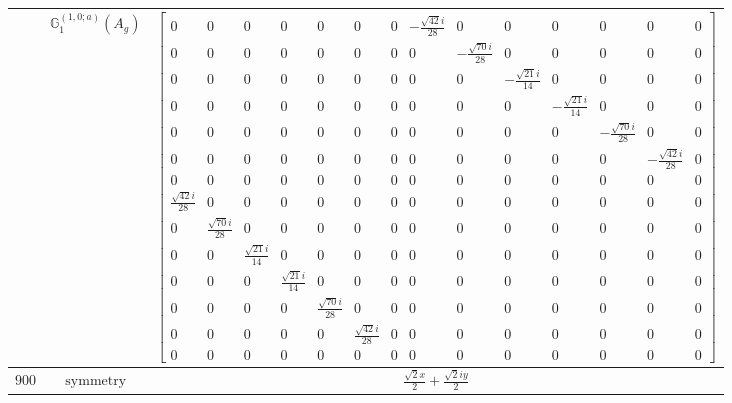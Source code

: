 \documentclass[fleqn,8pt,landscape]{jsarticle}
\begin{document}
\begin{longtable}{ccc}
$  $ & $ \mathbb{G}_{1}^{(1,0;a)}(A_{g}) $ & $ \begin{bmatrix} 0 & 0 & 0 & 0 & 0 & 0 & 0 & - \frac{\sqrt{42} i}{28} & 0 & 0 & 0 & 0 & 0 & 0 \\ 0 & 0 & 0 & 0 & 0 & 0 & 0 & 0 & - \frac{\sqrt{70} i}{28} & 0 & 0 & 0 & 0 & 0 \\ 0 & 0 & 0 & 0 & 0 & 0 & 0 & 0 & 0 & - \frac{\sqrt{21} i}{14} & 0 & 0 & 0 & 0 \\ 0 & 0 & 0 & 0 & 0 & 0 & 0 & 0 & 0 & 0 & - \frac{\sqrt{21} i}{14} & 0 & 0 & 0 \\ 0 & 0 & 0 & 0 & 0 & 0 & 0 & 0 & 0 & 0 & 0 & - \frac{\sqrt{70} i}{28} & 0 & 0 \\ 0 & 0 & 0 & 0 & 0 & 0 & 0 & 0 & 0 & 0 & 0 & 0 & - \frac{\sqrt{42} i}{28} & 0 \\ 0 & 0 & 0 & 0 & 0 & 0 & 0 & 0 & 0 & 0 & 0 & 0 & 0 & 0 \\ \frac{\sqrt{42} i}{28} & 0 & 0 & 0 & 0 & 0 & 0 & 0 & 0 & 0 & 0 & 0 & 0 & 0 \\ 0 & \frac{\sqrt{70} i}{28} & 0 & 0 & 0 & 0 & 0 & 0 & 0 & 0 & 0 & 0 & 0 & 0 \\ 0 & 0 & \frac{\sqrt{21} i}{14} & 0 & 0 & 0 & 0 & 0 & 0 & 0 & 0 & 0 & 0 & 0 \\ 0 & 0 & 0 & \frac{\sqrt{21} i}{14} & 0 & 0 & 0 & 0 & 0 & 0 & 0 & 0 & 0 & 0 \\ 0 & 0 & 0 & 0 & \frac{\sqrt{70} i}{28} & 0 & 0 & 0 & 0 & 0 & 0 & 0 & 0 & 0 \\ 0 & 0 & 0 & 0 & 0 & \frac{\sqrt{42} i}{28} & 0 & 0 & 0 & 0 & 0 & 0 & 0 & 0 \\ 0 & 0 & 0 & 0 & 0 & 0 & 0 & 0 & 0 & 0 & 0 & 0 & 0 & 0 \end{bmatrix} $ \\ \hline
$ 900 $ & $ \text{symmetry} $ & $ \frac{\sqrt{2} x}{2} + \frac{\sqrt{2} i y}{2} $ \\

\end{longtable}
\end{document}
